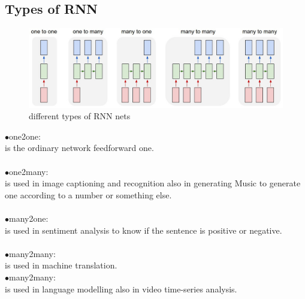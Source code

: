 \subsection{Types of RNN}
\begin{figure}[H]%
    \center%
    \includegraphics[width=\textwidth]{images/amir/diags.png}
    \caption[RNN Types]{different types of RNN nets}\label{fig:RNN types}%
  \end{figure}
\indent$\bullet$\hspace{5pt}one2one:\\ is the ordinary network feedforward one.\\\\
\indent$\bullet$\hspace{5pt}one2many:\\ is used in image captioning and recognition also in generating Music to generate one according to a number or something else.\\\\
\indent$\bullet$\hspace{5pt}many2one:\\ is used in sentiment analysis to know if the sentence is positive or negative.\\\\
\indent$\bullet$\hspace{5pt}many2many:\\ is used in machine translation.\\
\indent$\bullet$\hspace{5pt}many2many:\\is used in language modelling also in video time-series analysis.\\\\
